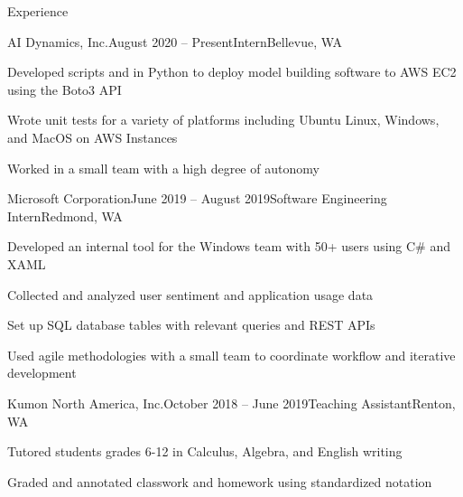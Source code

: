 \documentclass{resume} %
\begin{document}
\begin{rSection}{Experience}

\begin{rSubsection}{AI Dynamics, Inc.}{August 2020 – Present}{Intern}{Bellevue, WA}
\item Developed scripts and in Python to deploy model building software to AWS EC2 using the Boto3 API
\item Wrote unit tests for a variety of platforms including Ubuntu Linux, Windows, and MacOS on AWS Instances
\item Worked in a small team with a high degree of autonomy
\end{rSubsection}

\begin{rSubsection}{Microsoft Corporation}{June 2019 – August 2019}{Software Engineering Intern}{Redmond, WA}
\item Developed an internal tool for the Windows team with 50+ users using C\# and XAML
\item Collected and analyzed user sentiment and application usage data
\item Set up SQL database tables with relevant queries and REST APIs
\item Used agile methodologies with a small team to coordinate workflow and iterative development
\end{rSubsection}

\begin{rSubsection}{Kumon North America, Inc.}{October 2018 – June 2019}{Teaching Assistant}{Renton, WA}
\item Tutored students grades 6-12 in Calculus, Algebra, and English writing
\item Graded and annotated classwork and homework using standardized notation
\end{rSubsection}

\end{rSection}


\end{document}
